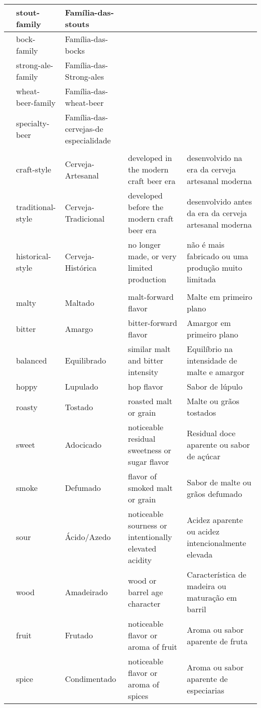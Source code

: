 \begin{longtable}{ | p{32mm} | p{32mm} | p{32mm} | p{32mm} | p{32mm} | }
\hline
& stout-family & Família-das-stouts & & \\
\hline
& bock-family & Família-das-bocks & & \\
\hline
& strong-ale-family & Família-das-Strong-ales & & \\
\hline
& wheat-beer-family & Família-das-wheat-beer & & \\
\hline
& specialty-beer & Família-das-cervejas-de especialidade & & \\
\hline
\rowcolor{darkgray}
\multicolumn{5}{|l|}{\color{white}\textbf{Era (Era)}} \\
\hline
& craft-style & Cerveja-Artesanal & developed in the modern craft beer era & desenvolvido na era da cerveja artesanal moderna \\
\hline
& traditional-style & Cerveja-Tradicional & developed before the modern craft beer era & desenvolvido antes da era da cerveja artesanal moderna \\
\hline
& historical-style & Cerveja-Histórica & no longer made, or very limited production & não é mais fabricado ou uma produção muito limitada \\
\hline
\rowcolor{darkgray}
\multicolumn{5}{|l|}{\color{white}\textbf{Dominant Flavor (Sabor Dominante)}} \\
\hline
& malty & Maltado & malt-forward flavor & Malte em primeiro plano \\
\hline
& bitter & Amargo & bitter-forward flavor & Amargor em primeiro plano \\
\hline
& balanced & Equilibrado & similar malt and bitter intensity & Equilíbrio na intensidade de malte e amargor \\
\hline
& hoppy & Lupulado & hop flavor & Sabor de lúpulo \\
\hline
& roasty & Tostado & roasted malt or grain & Malte ou grãos tostados \\
\hline
& sweet & Adocicado & noticeable residual sweetness or sugar flavor & Residual doce aparente ou sabor de açúcar \\
\hline
& smoke & Defumado & flavor of smoked malt or grain & Sabor de malte ou grãos defumado \\
\hline
& sour & Ácido/Azedo & noticeable sourness or intentionally elevated acidity & Acidez aparente ou acidez intencionalmente elevada \\
\hline
& wood & Amadeirado & wood or barrel age character & Característica de madeira ou maturação em barril \\
\hline
& fruit & Frutado & noticeable flavor or aroma of fruit & Aroma ou sabor aparente de fruta \\
\hline
& spice & Condimentado & noticeable flavor or aroma of spices & Aroma ou sabor aparente de especiarias \\
\hline
\end{longtable}